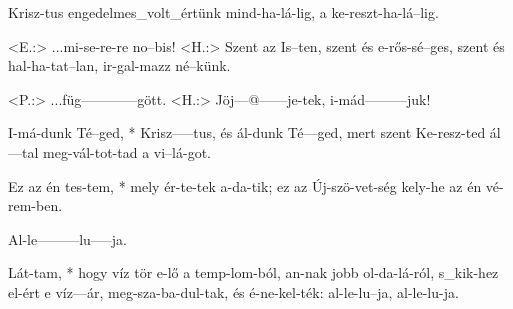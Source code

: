 \documentclass{article}
\begin{document}
\begin{gregosheet}
            {Krisz-tus engedelmes_volt_értünk mind-ha-lá-lig,  a ke-reszt-ha-lá--lig.}
\end{gregosheet}

\newpage

\begin{gregosheet}
            {   <E.:> ...mi-se-re-re no--bis!  <H.:> Szent az Is--ten, szent és e-rős-sé--ges, szent és hal-ha-tat--lan, ir-gal-mazz né--künk.}
\end{gregosheet}

\newpage

\begin{gregosheet}
            {   <P.:> ...füg------------gött.   <H.:> Jöj---@------je-tek, i-mád---------juk!}
\end{gregosheet}

\newpage

\begin{gregosheet}
            {  I-má-dunk Té--ged, * Krisz-----tus, és ál-dunk Té---ged, mert szent Ke-resz-ted ál---tal meg-vál-tot-tad a vi--lá-got.}
\end{gregosheet}

\newpage

\begin{gregosheet}
            {   Ez az én  tes-tem, * mely ér-te-tek a-da-tik; ez az Új-szö-vet-ség kely-he  az  én vé-rem-ben.}
\end{gregosheet}


\begin{gregosheet}
            {   Al-le---------lu-----ja.}
\end{gregosheet}

\newpage

\begin{gregosheet}
            {  Lát-tam, * hogy víz tör e-lő a temp-lom-ból, an-nak jobb ol-da-lá-ról, s_kik-hez el-ért e víz---ár,       meg-sza-ba-dul-tak, és é-ne-kel-ték: al-le-lu--ja, al-le-lu-ja.  }
\end{gregosheet}
\end{document}

